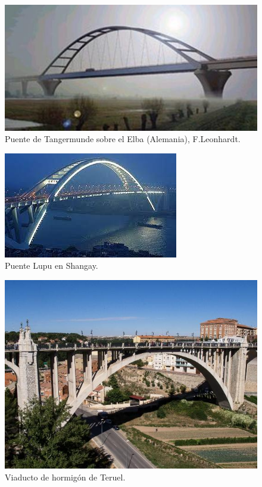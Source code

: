 \begin{figure}[h]
    \centering
    \includegraphics[width=1\linewidth]{Imagenes/Puente de Tangermunde.png}
    \caption{Puente de Tangermunde sobre el Elba (Alemania), F.Leonhardt.}
    \label{fig:Puente arco con tablero inferior}
\end{figure}

\begin{figure}[h]
    \centering
    \includegraphics[width=1\linewidth]{Imagenes/Puente Lupu.png}
    \caption{Puente Lupu en Shangay.}
    \label{fig:Puente arco con tablero intermedio}
\end{figure}

\begin{figure}[h]
    \centering
    \includegraphics[width=1\linewidth]{Imagenes/Viaducto de hormigon de teruel.png}
    \caption{Viaducto de hormigón de Teruel.}
    \label{fig:Puente arco con tablero superior}
\end{figure}

